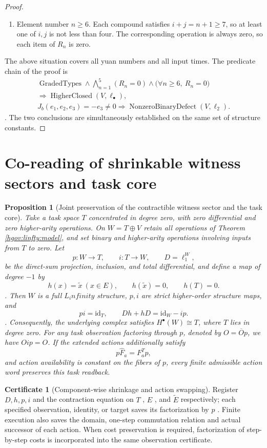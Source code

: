 \documentclass[12pt,a4paper,openany,notitlepage]{report}
\theoremstyle{plain}
\newtheorem{proposition}[theorem]{Proposition}
\theoremstyle{definition}
\newtheorem*{certificate}{Certificate}
\theoremstyle{remark}
\def\mathcal#1{#1}\def\mathsf#1{#1}\def\mathbb#1{#1}%
\def\infty{infinity}\def\Gamma{Gamma}\def\Phi{Phi}%
\begin{document}
\begin{CJK*}
\begin{proof}
\begin{enumerate}
\item
Element number $n\ge6$. Each compound satisfies $i+j=n+1\ge7$, so at least one of $i,j$ is not less than four. The corresponding operation is always zero, so each item of $\mathcal R_n$ is zero.\end{enumerate}
The above situation covers all yuan numbers and all input times. The predicate chain of the proof is \[
\begin{gathered}
\operatorname{GradedTypes}\land
\bigwedge_{n=1}^{5}(\mathcal R_n=0)
\land
\bigl(\forall n\ge6,\ \mathcal R_n=0\bigr)\\
\Rightarrow\operatorname{HigherClosed}(V,\ell_\bullet),\\
J_b(e_1,e_2,e_3)=-e_3\ne0
\Rightarrow\operatorname{NonzeroBinaryDefect}(V,\ell_2).
\end{gathered}
\]. The two conclusions are simultaneously established on the same set of structure constants.\end{proof}


\section { Co-reading of shrinkable witness sectors and task core }

\begin{proposition} [Joint preservation of the contractible witness sector and the task core]
\label{hgov:linfty:task}
Take a task space $T$ concentrated in degree zero, with zero differential and zero higher-arity operations. On $W=T\oplus V$ retain all operations of Theorem \ref{hgov:linfty:model}, and set binary and higher-arity operations involving inputs from $T$ to zero. Let
\[
p:W\to T,\qquad i:T\to W,\qquad D=\ell_1^W,
\]
be the direct-sum projection, inclusion, and total differential, and define a map of degree $-1$ by
\[
h(x)=\widetilde x\ (x\in E),\qquad
h(\widetilde x)=0,\qquad h(T)=0.
\].
Then $W$ is a full $L_\infty$ structure, $p,i$ are strict higher-order structure maps, and
\[
pi=\mathrm{id}_T,\qquad
Dh+hD=\mathrm{id}_W-ip.
\].
Consequently, the underlying complex satisfies $H^\bullet(W)\cong T$, where $T$ lies in degree zero. For any task observation factoring through $p$, denoted by $O=\overline O p$, we have $Oip=O$. If the extended actions additionally satisfy
\[
p\widehat F_a=F_a^Tp,
\]
and action availability is constant on the fibers of $p$, every finite admissible action word preserves this task readback.
\end{proposition}

\begin{certificate}
[Component-wise shrinkage and action swapping]\label{hgov:linfty:task-certificate}
Register $D,h,p,i$ and the contraction equation on $T$ , $E$ , and $\widetilde E$ respectively; each specified observation, identity, or target saves its factorization by $p$ . Finite execution also saves the domain, one-step commutation relation and actual successor of each action. When cost preservation is required, factorization of step-by-step costs is incorporated into the same observation certificate.\end{certificate}



\end{CJK*}
\end{document}
